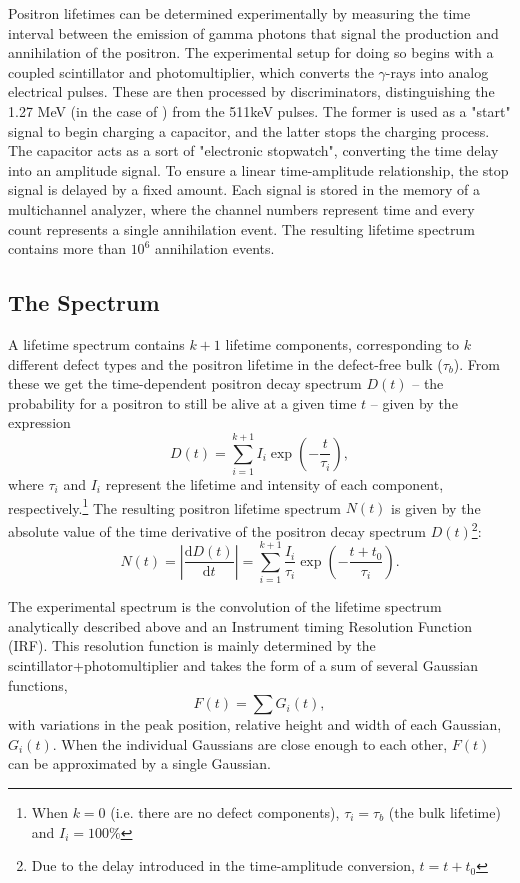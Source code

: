 Positron lifetimes can be determined experimentally by measuring the time interval between the emission of gamma photons that signal the production and annihilation of the positron. The experimental setup for doing so begins with a coupled scintillator and photomultiplier, which converts the $\gamma$-rays into analog electrical pulses. These are then processed by discriminators, distinguishing the 1.27 MeV (in the case of ) from the 511keV pulses. The former is used as a "start" signal to begin charging a capacitor, and the latter stops the charging process. The capacitor acts as a sort of "electronic stopwatch", converting the time delay into an amplitude signal. To ensure a linear time-amplitude relationship, the stop signal is delayed by a fixed amount. Each signal is stored in the memory of a multichannel analyzer, where the channel numbers represent time and every count represents a single annihilation event. The resulting lifetime spectrum contains more than $10^6$ annihilation events.

\subsection{The Spectrum}

A lifetime spectrum contains $k+1$ lifetime components, corresponding to $k$ different defect types and the positron lifetime in the defect-free bulk ($\tau_b$). From these we get the time-dependent positron decay spectrum $D(t)$ -- the probability for a positron to still be alive at a given time $t$ \cite{EFermi} -- given by the expression
\begin{equation}
    D(t) = \sum_{i=1}^{k+1}I_i\exp\left(-\frac{t}{\tau_i}\right),
    \label{eq:decayspec}
\end{equation}
where $\tau_i$ and $I_i$ represent the lifetime and intensity of each component, respectively.\footnote{When $k=0$ (i.e. there are no defect components), $\tau_i = \tau_b$ (the bulk lifetime) and $I_i = 100\%$} The resulting positron lifetime spectrum $N(t)$ is given by the absolute value of the time derivative of the positron decay spectrum $D(t)$\footnote{Due to the delay introduced in the time-amplitude conversion, $t = t + t_0$}:
\begin{equation}
    N(t) = \left|\frac{\mathrm{d}D(t)}{\mathrm{d}t}\right| = \sum_{i=1}^{k+1}\frac{I_i}{\tau_i}\exp\left(-\frac{t + t_0}{\tau_i}\right).
    \label{eq:lifespec}
\end{equation}

The experimental spectrum is the convolution of the lifetime spectrum analytically described above and an Instrument timing Resolution Function (IRF). This resolution function is mainly determined by the scintillator+photomultiplier and takes the form of a sum of several Gaussian functions, 
\begin{equation}
    F(t) = \sum G_i(t),
    \label{eq:IRF}
\end{equation}
with variations in the peak position, relative height and width of each Gaussian, $G_i(t)$. When the individual Gaussians are close enough to each other, $F(t)$ can be approximated by a single Gaussian. 

